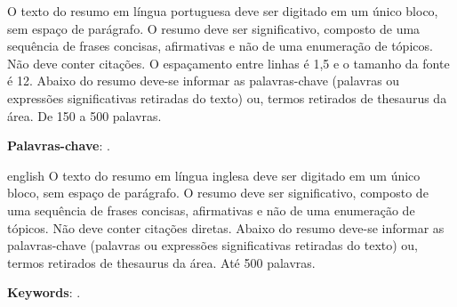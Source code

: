 \setlength{\absparsep}{18pt} %
\begin{resumo}
O texto do resumo em língua portuguesa deve ser digitado em um único bloco, sem espaço de parágrafo. O resumo deve ser significativo, composto de uma sequência de frases concisas, afirmativas e não de uma enumeração de tópicos. Não deve conter citações. O espaçamento entre linhas é 1,5 e o tamanho da fonte é 12. Abaixo do resumo deve-se informar as palavras-chave (palavras ou expressões significativas retiradas do texto) ou, termos retirados de thesaurus da área. De 150 a 500 palavras.
	
	\textbf{Palavras-chave}: \PalavrasChave.
\end{resumo}

\begin{resumo}[Abstract]
	\begin{otherlanguage*}{english}
O texto do resumo em língua inglesa deve ser digitado em um único bloco, sem espaço de parágrafo. O resumo deve ser significativo, composto de uma sequência de frases concisas, afirmativas e não de uma enumeração de tópicos. Não deve conter citações diretas. Abaixo do resumo deve-se informar as palavras-chave (palavras ou expressões significativas retiradas do texto) ou, termos retirados de thesaurus da área. Até 500 palavras.
 
		\textbf{Keywords}: \Keywords.
	\end{otherlanguage*}
\end{resumo}